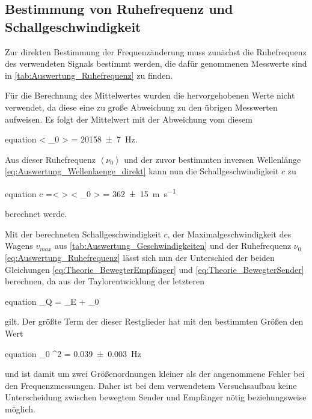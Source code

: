 	 
 	
 	
	
\subsection{Bestimmung von Ruhefrequenz und Schallgeschwindigkeit}
	
	Zur direkten Bestimmung der Frequenzänderung muss zunächst die Ruhefrequenz
	des verwendeten Signals bestimmt werden, die dafür genommenen Messwerte  
	sind in \cref{tab:Auswertung_Ruhefrequenz} zu finden.  
	
		
	
	Für die Berechnung des Mittelwertes wurden die hervorgehobenen Werte nicht verwendet,
	da diese eine zu große Abweichung zu den übrigen Messwerten aufweisen. Es folgt
	der Mittelwert mit der Abweichung vom diesem
	\begin{empheq}{equation}
		\label{eq:Auswertung_Ruhefrequenz}
		\left< \nu_{0} \right> = \SI{20158(7)}{\hertz}.
	\end{empheq} 
	
	Aus dieser Ruhefrequenz $\left< \nu_{0} \right>$ und der zuvor bestimmten inversen Wellenlänge 
	\cref{eq:Auswertung_Wellenlaenge_direkt} kann nun die Schallgeschwindigkeit $c$ zu
	\begin{empheq}{equation}
		c =\left<  \lambda \right> \cdot \left< \nu_{0} \right> = \SI{362(15)}{\meter\per\second}
	\end{empheq}
	berechnet werde. 
	
	Mit der berechneten Schallgeschwindigkeit $c$, der Maximalgeschwindigkeit des Wagens 
	$v_{max}$ aus \cref{tab:Auswertung_Geschwindigkeiten} und der Ruhefrequenz $\nu_{0}$ 
	\cref{eq:Auswertung_Ruhefrequenz} lässt sich nun der Unterschied der beiden Gleichungen 
	\cref{eq:Theorie_BewegterEmpfänger} und \cref{eq:Theorie_BewegterSender} berechnen,
	da aus der Taylorentwicklung der letzteren 
	\begin{empheq}{equation}
		\nu_{Q} = \nu_{E} + \nu_{0} \cdot {}
	\end{empheq} 
	gilt.
	Der größte Term der dieser Restglieder hat mit den bestimmten Größen den Wert
		\begin{empheq}{equation}
		\nu_{0} \cdot {}^{2} = \SI{0.039(3)}{\hertz}
		\end{empheq} 
	und ist damit um zwei Größenordnungen kleiner als der angenommene Fehler bei den Frequenzmessungen.
	Daher ist bei dem verwendetem Versuchsaufbau keine Unterscheidung zwischen bewegtem Sender und 
	Empfänger nötig beziehungsweise möglich.     
		
